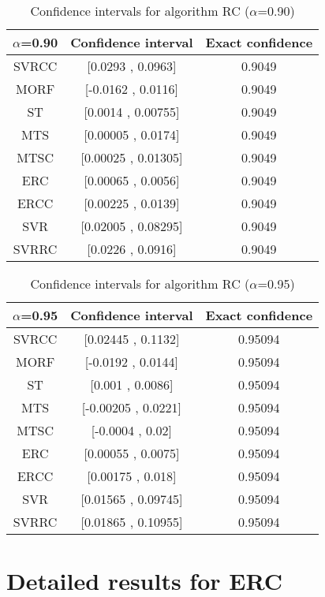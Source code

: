 \documentclass[a4paper,10pt]{article}
\begin{document}
\begin{table}[!htp]
\centering\small
\begin{tabular}{
|c|c|c|}
\hline
 $\alpha$=0.90 & Confidence interval & Exact confidence \\ \hline 
SVRCC & [0.0293 , 0.0963] & 0.9049\\ \hline 
MORF & [-0.0162 , 0.0116] & 0.9049\\ \hline 
ST & [0.0014 , 0.00755] & 0.9049\\ \hline 
MTS & [0.00005 , 0.0174] & 0.9049\\ \hline 
MTSC & [0.00025 , 0.01305] & 0.9049\\ \hline 
ERC & [0.00065 , 0.0056] & 0.9049\\ \hline 
ERCC & [0.00225 , 0.0139] & 0.9049\\ \hline 
SVR & [0.02005 , 0.08295] & 0.9049\\ \hline 
SVRRC & [0.0226 , 0.0916] & 0.9049\\ \hline 

\end{tabular}
\caption{Confidence intervals for algorithm RC ($\alpha$=0.90)}
\end{table}
\begin{table}[!htp]
\centering\small
\begin{tabular}{
|c|c|c|}
\hline
 $\alpha$=0.95 & Confidence interval & Exact confidence \\ \hline 
SVRCC & [0.02445 , 0.1132] & 0.95094\\ \hline 
MORF & [-0.0192 , 0.0144] & 0.95094\\ \hline 
ST & [0.001 , 0.0086] & 0.95094\\ \hline 
MTS & [-0.00205 , 0.0221] & 0.95094\\ \hline 
MTSC & [-0.0004 , 0.02] & 0.95094\\ \hline 
ERC & [0.00055 , 0.0075] & 0.95094\\ \hline 
ERCC & [0.00175 , 0.018] & 0.95094\\ \hline 
SVR & [0.01565 , 0.09745] & 0.95094\\ \hline 
SVRRC & [0.01865 , 0.10955] & 0.95094\\ \hline 

\end{tabular}
\caption{Confidence intervals for algorithm RC ($\alpha$=0.95)}
\end{table}

 \clearpage 


\section{Detailed results for ERC}
\end{document}
